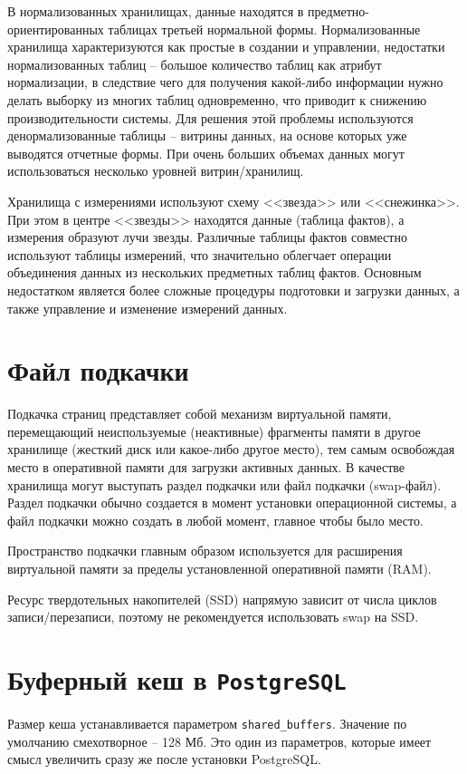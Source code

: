 \documentclass[%
	11pt,
	a4paper,
	utf8,
		]{article}
\begin{document}
В нормализованных хранилищах, данные находятся в предметно-ориентированных таблицах третьей нормальной формы. Нормализованные хранилища характеризуются как простые в создании и управлении, недостатки нормализованных таблиц -- большое количество таблиц как атрибут нормализации, в следствие чего для получения какой-либо информации нужно делать выборку из многих таблиц одновременно, что приводит к снижению производительности системы. Для решения этой проблемы используются денормализованные таблицы -- витрины данных, на основе которых уже выводятся отчетные формы. При очень больших объемах данных могут использоваться несколько уровней витрин/хранилищ.

Хранилища с измерениями используют схему <<звезда>> или <<снежинка>>. При этом в центре <<звезды>> находятся данные (таблица фактов), а измерения образуют лучи звезды. Различные таблицы фактов совместно используют таблицы измерений, что значительно облегчает операции объединения данных из нескольких предметных таблиц фактов. Основным недостатком является более сложные процедуры подготовки и загрузки данных, а также управление и изменение измерений данных.

\section{Файл подкачки}

Подкачка страниц представляет собой механизм виртуальной памяти, перемещающий неиспользуемые (неактивные) фрагменты памяти в другое хранилище (жесткий диск или какое-либо другое место), тем самым освобождая место в оперативной памяти для загрузки активных данных. В качестве хранилища могут выступать раздел подкачки или файл подкачки (swap-файл). Раздел подкачки обычно создается в момент установки операционной системы, а файл подкачки можно создать в любой момент, главное чтобы было место.

Пространство подкачки главным образом используется для расширения виртуальной памяти за пределы установленной оперативной памяти (RAM).

Ресурс твердотельных накопителей (SSD) напрямую зависит от числа циклов записи/перезаписи, поэтому не рекомендуется использовать swap на SSD.

\section{Буферный кеш в \texttt{PostgreSQL}}

Размер кеша устанавливается параметром \verb|shared_buffers|. Значение по умолчанию смехотворное -- 128 Мб. Это один из параметров, которые имеет смысл увеличить сразу же после установки PostgreSQL.
\end{document}
